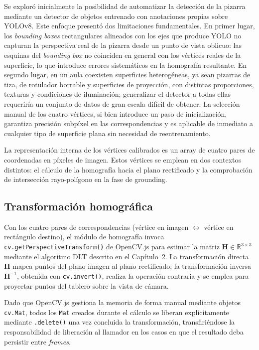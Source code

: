 \documentclass[12pt]{report} %
\begin{document}
Se exploró inicialmente la posibilidad de automatizar la detección de la pizarra mediante un detector de objetos entrenado con anotaciones propias sobre YOLOv8. Este enfoque presentó dos limitaciones fundamentales. En primer lugar, los \textit{bounding boxes} rectangulares alineados con los ejes que produce YOLO no capturan la perspectiva real de la pizarra desde un punto de vista oblicuo: las esquinas del \textit{bounding box} no coinciden en general con los vértices reales de la superficie, lo que introduce errores sistemáticos en la homografía resultante. En segundo lugar, en un aula coexisten superficies heterogéneas, ya sean pizarras de tiza, de rotulador borrable y superficies de proyección, con distintas proporciones, texturas y condiciones de iluminación; generalizar el detector a todas ellas requeriría un conjunto de datos de gran escala difícil de obtener. La selección manual de los cuatro vértices, si bien introduce un paso de inicialización, garantiza precisión subpíxel en las correspondencias y es aplicable de inmediato a cualquier tipo de superficie plana sin necesidad de reentrenamiento.

La representación interna de los vértices calibrados es un array de cuatro pares de coordenadas en píxeles de imagen. Estos vértices se emplean en dos contextos distintos: el cálculo de la homografía hacia el plano rectificado y la comprobación de intersección rayo-polígono en la fase de grounding.

\subsection{Transformación homográfica}

Con los cuatro pares de correspondencias (vértice en imagen $\leftrightarrow$ vértice en rectángulo destino), el módulo de homografía invoca \texttt{cv.getPerspectiveTransform()} de OpenCV.js para estimar la matriz $\mathbf{H} \in \mathbb{R}^{3\times 3}$ mediante el algoritmo DLT descrito en el Capítulo~2. La transformación directa $\mathbf{H}$ mapea puntos del plano imagen al plano rectificado; la transformación inversa $\mathbf{H}^{-1}$, obtenida con \texttt{cv.invert()}, realiza la operación contraria y se emplea para proyectar puntos del tablero sobre la vista de cámara.

Dado que OpenCV.js gestiona la memoria de forma manual mediante objetos \texttt{cv.Mat}, todos los \texttt{Mat} creados durante el cálculo se liberan explícitamente mediante \texttt{.delete()} una vez concluida la transformación, transfiriéndose la responsabilidad de liberación al llamador en los casos en que el resultado deba persistir entre \textit{frames}.
\end{document}
